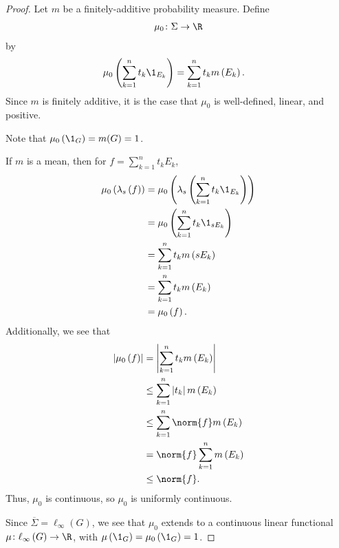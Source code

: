 \documentclass[10pt]{mypackage}
\begin{document}
\begin{proof}
  Let $m$ be a finitely-additive probability measure. Define
  \begin{align*}
    \mu_0\colon \Sigma \rightarrow \R
  \end{align*}
  by
  \begin{align*}
    \mu_0\left(\sum_{k=1}^{n}t_k\1_{E_k}\right) &= \sum_{k=1}^{n}t_km\left(E_k\right).
  \end{align*}
  Since $m$ is finitely additive, it is the case that $\mu_0$ is well-defined, linear, and positive.\newline

  Note that $\mu_0\left(\1_{G}\right) = m(G) = 1$.\newline

  If $m$ is a mean, then for $f = \sum_{k=1}^{n}t_kE_k$,
  \begin{align*}
    \mu_0\left(\lambda_s\left(f\right)\right) &= \mu_{0}\left(\lambda_{s}\left(\sum_{k=1}^{n}t_k\1_{E_k}\right)\right)\\
                                              &= \mu_0\left(\sum_{k=1}^{n}t_k\1_{sE_k}\right)\\
                                              &= \sum_{k=1}^{n}t_km\left(sE_k\right)\\
                                              &= \sum_{k=1}^{n}t_km\left(E_k\right)\\
                                              &= \mu_0\left(f\right).
  \end{align*}
  Additionally, we see that
  \begin{align*}
    \left\vert \mu_0\left(f\right) \right\vert &= \left\vert \sum_{k=1}^{n}t_km\left(E_k\right) \right\vert\\
                                               &\leq \sum_{k=1}^{n}\left\vert t_k \right\vert m\left(E_k\right)\\
                                               &\leq \sum_{k=1}^{n}\norm{f}m\left(E_k\right)\\
                                               &= \norm{f}\sum_{k=1}^{n}m\left(E_k\right)\\
                                               &\leq \norm{f}.
  \end{align*}
  Thus, $\mu_0$ is continuous, so $\mu_0$ is uniformly continuous.\newline

  Since $\overline{\Sigma} = \ell_{\infty}(G)$, we see that $\mu_0$ extends to a continuous linear functional $\mu\colon \ell_{\infty}\left(G\right) \rightarrow \R$, with $\mu\left(\1_{G}\right) = \mu_{0}\left(\1_{G}\right) = 1$.\newline


\end{proof}
\end{document}
